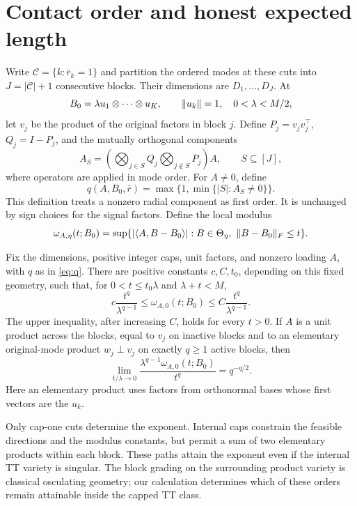 \section{Contact order and honest expected length}\label{sec:theory}
Write $\mathcal C=\{k:\bar r_k=1\}$ and partition the ordered modes at these cuts into $J=|\mathcal C|+1$ consecutive blocks. Their dimensions are $D_1,\ldots,D_J$. At
\[
 B_0=\lambda u_1\otimes\cdots\otimes u_K,
 \qquad \lVert u_k\rVert=1,\quad 0<\lambda<M/2,
\]
let $v_j$ be the product of the original factors in block $j$. Define $P_j=v_jv_j^\top$, $Q_j=I-P_j$, and the mutually orthogonal components
\[
 A_S=\left(\bigotimes_{j\in S}Q_j\bigotimes_{j\notin S}P_j\right)A,
 \qquad S\subseteq[J],
\]
where operators are applied in mode order. For $A\ne0$, define
\begin{equation}\label{eq:q}
 q(A,B_0,\bar r)=\max\{1,\min\{|S|:A_S\ne0\}\}.
\end{equation}
This definition treats a nonzero radial component as first order. It is unchanged by sign choices for the signal factors. Define the local modulus
\[
 \omega_{A,\eta}(t;B_0)=\sup\{|\ip{A}{B-B_0}|:B\in\Th_\eta,\ \norm{B-B_0}_F\le t\}.
\]

\begin{theorem}\label{thm:contact}
Fix the dimensions, positive integer caps, unit factors, and nonzero loading $A$, with $q$ as in \eqref{eq:q}. There are positive constants $c,C,t_0$, depending on this fixed geometry, such that, for $0<t\le t_0\lambda$ and $\lambda+t<M$,
\begin{equation}\label{eq:modulus}
 c\frac{t^q}{\lambda^{q-1}}\le\omega_{A,0}(t;B_0)
 \le C\frac{t^q}{\lambda^{q-1}}.
\end{equation}
The upper inequality, after increasing $C$, holds for every $t>0$. If $A$ is a unit product across the blocks, equal to $v_j$ on inactive blocks and to an elementary original-mode product $w_j\perp v_j$ on exactly $q\ge1$ active blocks, then
\begin{equation}\label{eq:sharpconstant}
 \lim_{t/\lambda\to0}\frac{\lambda^{q-1}\omega_{A,0}(t;B_0)}{t^q}
 =q^{-q/2}.
\end{equation}
Here an elementary product uses factors from orthonormal bases whose first vectors are the $u_k$.
\end{theorem}

Only cap-one cuts determine the exponent. Internal caps constrain the feasible directions and the modulus constants, but permit a sum of two elementary products within each block. These paths attain the exponent even if the internal TT variety is singular. The block grading on the surrounding product variety is classical osculating geometry; our calculation determines which of these orders remain attainable inside the capped TT class.

